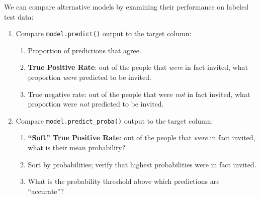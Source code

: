 \documentclass[12pt]{article}
\begin{document}
We can compare alternative models by examining their performance on labeled test data:

\begin{enumerate}
\item Compare {\tt model.predict()} output to the target column:
  \begin{enumerate}
  \item Proportion of predictions that agree.
  \item {\bf True Positive Rate}: out of the people that {\it were} in fact invited, what
    proportion {\it were} predicted to be invited.
  \item True negative rate: out of the people that were {\it not} in fact invited, what proportion
    were {\it not} predicted to be invited.
  \end{enumerate}
\item Compare {\tt model.predict\_proba()} output to the target column:
  \begin{enumerate}
  \item {\bf ``Soft'' True Positive Rate}: out of the people that {\it were} in fact invited, what
    is their mean probability?
  \item Sort by probabilities; verify that highest probabilities were in fact invited.
  \item What is the probability threshold above which predictions are ``accurate''?
  \end{enumerate}
\end{enumerate}
\end{document}
